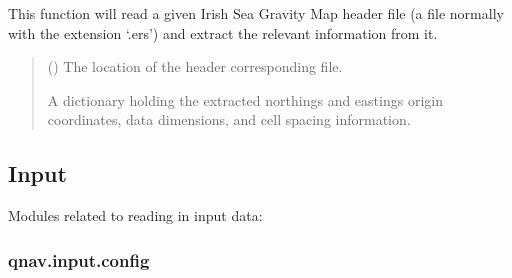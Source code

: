 \documentclass[letterpaper,10pt,english]{sphinxmanual}
\begin{document}
\begin{fulllineitems}
\label{\detokenize{modules/gravity/irish:qnav.gravity.irish.read_irish_ers_file}}
\pysigstartsignatures
{}
\pysigstopsignatures
\sphinxAtStartPar
This function will read a given Irish Sea Gravity Map header file (a file
normally with the extension ‘.ers’) and extract the relevant information
from it.
\begin{quote}\begin{description}
\sphinxAtStartPar
{} () \textendash{} The location of the header corresponding file.

\sphinxAtStartPar
A dictionary holding the extracted northings and eastings
origin coordinates, data dimensions, and cell spacing information.

\end{description}\end{quote}

\end{fulllineitems}



\subsection{Input}
\label{\detokenize{usage/packages:input}}
\sphinxAtStartPar
Modules related to reading in input data:

\sphinxstepscope


\subsubsection{qnav.input.config}
\label{\detokenize{modules/input/config:module-qnav.input.config}}\label{\detokenize{modules/input/config:qnav-input-config}}\label{\detokenize{modules/input/config::doc}}
\end{document}
